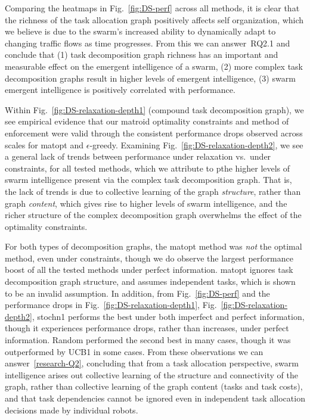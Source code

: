 Comparing the heatmaps in Fig.~\ref{fig:DS-perf} across all methods, it is clear that
the richness of the task allocation graph positively affects self organization, which
we believe is due to the swarm's increased ability to dynamically adapt to changing
traffic flows as time progresses. From this we can answer~\gls{RQ2.1} and
conclude that (1) task decomposition graph richness has an important and measurable
effect on the emergent intelligence of a swarm, (2) more complex task decomposition
graphs result in higher levels of emergent intelligence, (3) swarm emergent
intelligence is positively correlated with performance.

Within Fig.~\ref{fig:DS-relaxation-depth1} (compound task decomposition graph), we
see empirical evidence that our matroid optimality constraints and method of
enforcement were valid through the consistent performance drops observed across
scales for \gls{matopt} and $\epsilon$-greedy. Examining
Fig.~\ref{fig:DS-relaxation-depth2}, we see a general lack of trends between
performance under relaxation vs.~under constraints, for all tested methods, which we
attribute to pthe higher levels of swarm intelligence present via the complex task
decomposition graph. That is, the lack of trends is due to collective learning of the
graph \emph{structure}, rather than graph \emph{content}, which gives rise to higher
levels of swarm intelligence, and the richer structure of the complex decomposition
graph overwhelms the effect of the optimality constraints.

For both types of decomposition graphs, the \gls{matopt} method was \emph{not}
the optimal method, even under constraints, though we do observe the largest
performance boost of all the tested methods under perfect
information. \gls{matopt} ignores task decomposition graph structure, and
assumes independent tasks, which is shown to be an invalid assumption. In
addition, from Fig.~\ref{fig:DS-perf} and the performance drops in
Fig.~\ref{fig:DS-relaxation-depth1}, Fig.~\ref{fig:DS-relaxation-depth2},
\gls{stochn1} performs the best under both imperfect and perfect information,
though it experiences performance drops, rather than increases, under perfect
information. Random performed the second best in many cases, though it was
outperformed by UCB1 in some cases. From these observations we can
answer~\ref{research-Q2}, concluding that from a task allocation perspective,
swarm intelligence arises out collective learning of the structure and
connectivity of the graph, rather than collective learning of the graph content
(tasks and task costs), and that task dependencies cannot be ignored even in
independent task allocation decisions made by individual robots.

